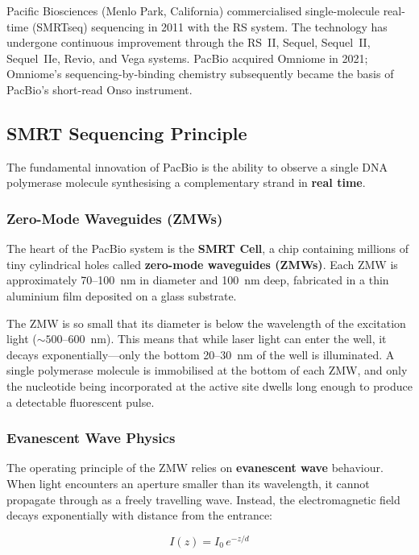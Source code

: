 Pacific Biosciences (Menlo Park, California) commercialised single-molecule real-time (\gls{SMRTseq}) sequencing in 2011 with the RS system. The technology has undergone continuous improvement through the RS~II, Sequel, Sequel~II, Sequel~IIe, Revio, and Vega systems. PacBio acquired Omniome in 2021; Omniome's sequencing-by-binding chemistry subsequently became the basis of PacBio's short-read Onso instrument.

\subsection{SMRT Sequencing Principle}

The fundamental innovation of PacBio is the ability to observe a single DNA polymerase molecule synthesising a complementary strand in \textbf{real time}.

\subsubsection{Zero-Mode Waveguides (ZMWs)}

The heart of the PacBio system is the \textbf{SMRT Cell}, a chip containing millions of tiny cylindrical holes called \textbf{zero-mode waveguides (ZMWs)}. Each ZMW is approximately 70--100~nm in diameter and 100~nm deep, fabricated in a thin aluminium film deposited on a glass substrate.

The ZMW is so small that its diameter is below the wavelength of the excitation light (${\sim}500$--600~nm). This means that while laser light can enter the well, it decays exponentially---only the bottom 20--30~nm of the well is illuminated. A single polymerase molecule is immobilised at the bottom of each ZMW, and only the nucleotide being incorporated at the active site dwells long enough to produce a detectable fluorescent pulse.

\subsubsection{Evanescent Wave Physics}
\label{subsubsec:longread:evanescent}

The operating principle of the ZMW relies on \textbf{evanescent wave} behaviour. When light encounters an aperture smaller than its wavelength, it cannot propagate through as a freely travelling wave. Instead, the electromagnetic field decays exponentially with distance from the entrance:

\begin{equation}
I(z) = I_0 \, e^{-z/d}
\label{eq:longread:evanescent}
\end{equation}


